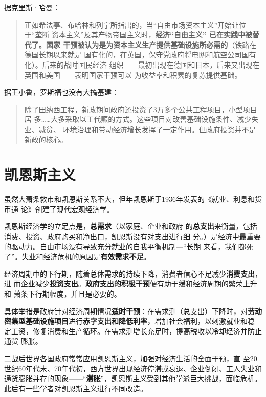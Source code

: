 \begin{enumerate}
  据克里斯·哈曼：
  \begin{quotation}
    正如希法亭、布哈林和列宁所指出的，当“自由市场资本主义”开始让位于“垄断
    资本主义”及其产物帝国主义时，\textbf{经济“自由主义” 已在实践中被替代了。国家
      干预被认为是为资本主义生产提供基础设施所必需的}（铁路在德国长期以来就是
    国有化的，在英国，保守党政府将电网和航空公司国有化）。后来的战时国民经济
    组织——最初出现在德国和日本，后来又出现在英国和美国——表明国家干预可以
    为收益率和积累的复苏提供基础。
  \end{quotation}

  据王小鲁，罗斯福也没有大搞基建：
  \begin{quotation}
    除了田纳西工程，新政期间政府还投资了3万多个公共工程项目，小型项目居
    多……大多采取以工代赈的方式。这些项目对改善基础设施条件、减少失业、减贫、
    环境治理和带动经济增长发挥了一定作用。但政府投资并不是新政的核心。
  \end{quotation}

\end{enumerate}

\section{凯恩斯主义}

虽然大萧条救市和凯恩斯关系不大，但年凯恩斯于1936年发表的《就业、利息和货币通
论》创建了现代宏观经济学。

凯恩斯经济学\cite{jahan2014keynesian}的立足点是，\textbf{总需求}（以家庭、企业和政府
的\textbf{总支出}来衡量，包括消费、投资、政府购买和净出口，凯恩斯没有对支出进行细
分。）是经济中最重要的驱动力。自由市场没有导致充分就业的自我平衡机制---“长期
来看，我们都死了”。失业和经济危机的原因是\textbf{有效需求不足}。

经济周期中的下行期，随着总体需求的持续下降，消费者信心不足减少\textbf{消费支出}，进
而企业减少\textbf{投资支出}。\textbf{政府支出的积极干预}便有助于缓和经济周期的繁荣上升和
萧条下行期幅度，并且是必要的。

具体举措是政府针对经济周期情况\textbf{适时干预}：在需求测（总支出）下降时，对\textbf{劳动
  密集型基础设施项目}进行\textbf{赤字支出和降低利率}，增加社会福利，以刺激就业和稳
定工资，修复消费和生产循环。在需求测增长充足时，提高税收以冷却经济并防止通货
膨胀。


二战后世界各国政府常常应用凯恩斯主义，加强对经济生活的全面干预，直
至20世纪60年代末、70年代初，西方世界出现经济停滞或衰退、企业倒闭、工人失业和
通货膨胀并存的现象——“\textbf{滞胀}”，凯恩斯主义受到其他学派巨大挑战，面临危机。
此后有一些学者对凯恩斯主义进行不同改造。

